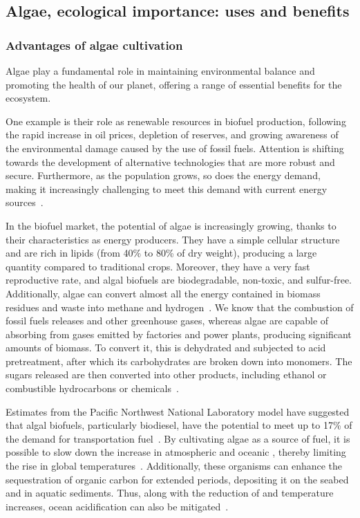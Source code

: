 \subsection{Algae, ecological importance: uses and benefits}
\subsubsection{Advantages of algae cultivation}
Algae play a fundamental role in maintaining environmental balance and promoting the health of our planet, offering a range of essential benefits for the ecosystem.

One example is their role as renewable resources in biofuel production, following the rapid increase in oil prices, depletion of reserves, and growing awareness of the environmental damage caused by the use of fossil fuels. Attention is shifting towards the development of alternative technologies that are more robust and secure. Furthermore, as the population grows, so does the energy demand, making it increasingly challenging to meet this demand with current energy sources~\parencite{faruk_role_2023}.

In the biofuel market, the potential of algae is increasingly growing, thanks to their characteristics as energy producers. They have a simple cellular structure and are rich in lipids (from 40\% to 80\%\zxriv{} of dry weight), producing a large quantity compared to traditional crops. Moreover, they have a very fast reproductive rate, and algal biofuels are biodegradable, non-toxic, and sulfur-free. Additionally, algae can convert almost all the energy contained in biomass residues and waste into methane and hydrogen~\parencite{suganya_Macroalgae_2016}. We know that the combustion of fossil fuels releases  and other greenhouse gases, whereas algae are capable of absorbing  from gases emitted by factories and power plants, producing significant amounts of biomass. To convert it, this is dehydrated and subjected to acid pretreatment, after which its carbohydrates are broken down into monomers. The sugars released are then converted into other products, including ethanol or combustible hydrocarbons or chemicals~\parencite{salami_AlgaeBased_2021}.

Estimates from the Pacific Northwest National Laboratory model have suggested that algal biofuels, particularly biodiesel, have the potential to meet up to \num{17}\% of the demand for transportation fuel~\parencite{dalrymple_Wastewater_2013}. By cultivating algae as a source of fuel, it is possible to slow down the increase in atmospheric and oceanic , thereby limiting the rise in global temperatures~\parencite{raven_possible_2017}. Additionally, these organisms can enhance the sequestration of organic carbon for extended periods, depositing it on the seabed and in aquatic sediments. Thus, along with the reduction of  and temperature increases, ocean acidification can also be mitigated~\parencite{prasad_Role_2021}.

